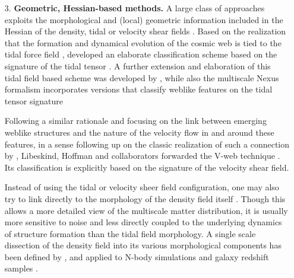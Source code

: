 \documentclass[useAMS,usenatbib]{mnras}
\begin{document}
\begin{itemize}
\item[3.] {\bf Geometric, Hessian-based methods.} A large class of approaches exploits the morphological and (local) geometric  information included in the Hessian of the density, tidal or velocity shear fields
\citep[e.g.][]{aragon2007,hahn2007a,forero2009,bond2010a,2012MNRAS.421L.137L,cautun2013}. Based on the realization that the formation and 
dynamical evolution of the cosmic web is tied to the tidal force field \citep[see][]{bondweb1996}, \cite{hahn2007a} 
developed an elaborate classification scheme based on the signature of the tidal tensor \citep[also see][]{hahn2007b}. 
A further extension and elaboration of this tidal field based scheme was developed by \cite{forero2009}, while also the 
multiscale Nexus formalism incorporates versions that classify weblike features on the tidal tensor signature \citep[][see below]{cautun2013}

Following a similar rationale and focusing on the link between emerging weblike structures and the nature of the 
velocity flow in and around these features, in a sense following up on the classic realization of such a connection by \cite{zeldovich1970}, 
Libeskind, Hoffman and collaborators forwarded the V-web technique \citep{2012MNRAS.425.2049H,2012MNRAS.421L.137L,2013MNRAS.428.2489L,2013ApJ...766L..15L,2014MNRAS.441.1974L,2014MNRAS.443.1274L,2015MNRAS.452.1052L,2015MNRAS.453L.108L,2015MNRAS.446.1458M,2016MNRAS.460..297M,2016MNRAS.458..900C,2016MNRAS.457..695P}. Its classification is explicitly based on the 
signature of the velocity shear field. 

Instead of using the tidal or velocity sheer field configuration, one may also try to link directly to the morphology of the density field itself 
\citep{aragon2007,bond2010a,cautun2013}. Though this allows a more detailed view of the  multiscale matter distribution, it 
is usually more sensitive to noise and less directly coupled to the underlying dynamics of structure formation than the tidal field morphology. 
A single scale dissection of the density field into its various morphological components has been defined by \cite{bond2010a}, and applied to N-body 
simulations and galaxy redshift samples \citep[also see][]{bond2010a,bond2010b,choi2010}. 


\end{itemize}
\end{document}
